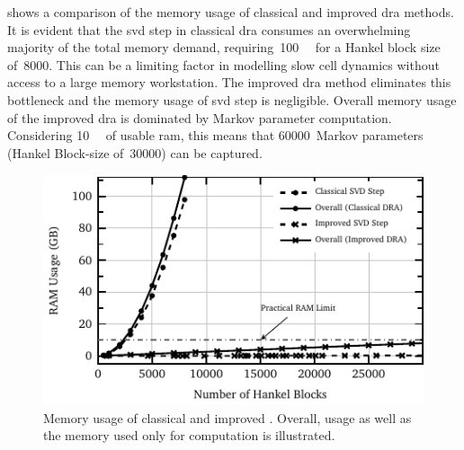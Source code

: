   shows a  comparison  of  the memory  usage  of classical  and
improved \gls{dra} methods.  It is evident that the \gls{svd}  step in classical
\gls{dra}  consumes  an  overwhelming  majority  of  the  total  memory  demand,
requiring~\approx\SI{100}{\giga\byte} for a Hankel block size of~8000. This can
be a limiting factor  in modelling slow cell dynamics without  access to a large
memory workstation. The improved \gls{dra} method eliminates this bottleneck and
the memory  usage of \gls{svd} step  is negligible. Overall memory  usage of the
improved  \gls{dra} is  dominated by  Markov parameter  computation. Considering
\SI{10}{\giga\byte} of usable \gls{ram}, this means that 60000~Markov parameters
(Hankel Block-size of~30000) can be captured.

\begin{figure}[!htbp]
    \centering
    \includegraphics{chapters/dra/figures/ram_usage.pdf}
    \caption[%
    Memory usage of classical and improved 
    ]%
    {%
        Memory  usage  of  classical and  improved  .  Overall,
          usage   as  well   as  the   memory  used   only  for
         computation is illustrated.
    }%
    \label{fig:memory}
\end{figure}

